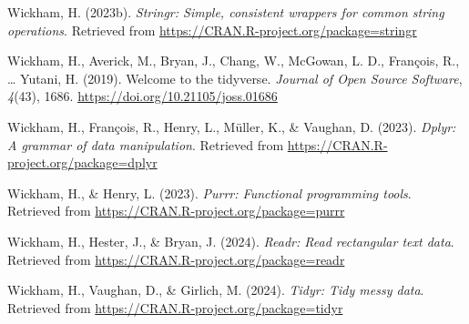 \documentclass[
  man,floatsintext]{apa6}
\newlength{\cslhangindent}
\newenvironment{CSLReferences}[2] %
 {\begin{list}{}{%
  \setlength{\itemindent}{0pt}
  \setlength{\leftmargin}{0pt}
  \setlength{\parsep}{0pt}
  \ifodd #1
   \setlength{\leftmargin}{\cslhangindent}
   \setlength{\itemindent}{-1\cslhangindent}
  \fi
  \setlength{\itemsep}{#2\baselineskip}}}
 {\end{list}}
\begin{document}
\begin{CSLReferences}{1}{0}
Wickham, H. (2023b). \emph{Stringr: Simple, consistent wrappers for common string operations}. Retrieved from \url{https://CRAN.R-project.org/package=stringr}

Wickham, H., Averick, M., Bryan, J., Chang, W., McGowan, L. D., François, R., \ldots{} Yutani, H. (2019). Welcome to the {tidyverse}. \emph{Journal of Open Source Software}, \emph{4}(43), 1686. \url{https://doi.org/10.21105/joss.01686}

Wickham, H., François, R., Henry, L., Müller, K., \& Vaughan, D. (2023). \emph{Dplyr: A grammar of data manipulation}. Retrieved from \url{https://CRAN.R-project.org/package=dplyr}

Wickham, H., \& Henry, L. (2023). \emph{Purrr: Functional programming tools}. Retrieved from \url{https://CRAN.R-project.org/package=purrr}

Wickham, H., Hester, J., \& Bryan, J. (2024). \emph{Readr: Read rectangular text data}. Retrieved from \url{https://CRAN.R-project.org/package=readr}

Wickham, H., Vaughan, D., \& Girlich, M. (2024). \emph{Tidyr: Tidy messy data}. Retrieved from \url{https://CRAN.R-project.org/package=tidyr}

\end{CSLReferences}
\end{document}
